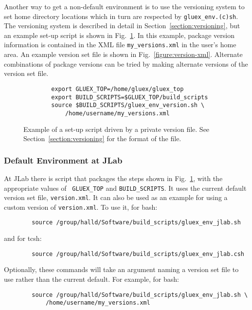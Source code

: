 \documentclass[12pt, letterpaper]{article}
\begin{document}
Another way to get a non-default environment is to use the versioning
system to set home directory locations which in turn are respected by
{\tt gluex\_env.(c)sh}. The versioning system is described in detail
in Section~\ref{section:versioning}, but an example set-up script is
shown in Fig.~\ref{figure:version-script}. In this example, package version
information is contained in the XML file {\tt my\_versions.xml} in the
user's home area. An example version set file is shown in Fig.~\ref{figure:version-xml}. Alternate combinations of package versions can be tried by making alternate versions of the version set file.

\begin{figure}
\begin{verbatim}
        export GLUEX_TOP=/home/gluex/gluex_top
        export BUILD_SCRIPTS=$GLUEX_TOP/build_scripts
        source $BUILD_SCRIPTS/gluex_env_version.sh \
            /home/username/my_versions.xml
\end{verbatim}
\caption{Example of a set-up script driven by a private version
  file. See Section~\ref{section:versioning} for the format of the
  file.}\label{figure:version-script}
\end{figure}

\subsubsection{Default Environment at JLab}

At JLab there is script that packages the steps shown in
Fig.~\ref{figure:version-script}, with the appropriate values of {\tt
  GLUEX\_TOP} and {\tt BUILD\_SCRIPTS}. It uses the current default version
set file,
{\tt version.xml}. It can also be used as an example for using a
custom version of {\tt version.xml}. To use it, for bash:
\begin{verbatim}
        source /group/halld/Software/build_scripts/gluex_env_jlab.sh
\end{verbatim}
and for tcsh:
\begin{verbatim}
        source /group/halld/Software/build_scripts/gluex_env_jlab.csh
\end{verbatim}
Optionally, these commands will take an argument naming a version set file to use rather than the current default. For example, for bash:
\begin{verbatim}
        source /group/halld/Software/build_scripts/gluex_env_jlab.sh \
            /home/username/my_versions.xml
\end{verbatim}
\end{document}
